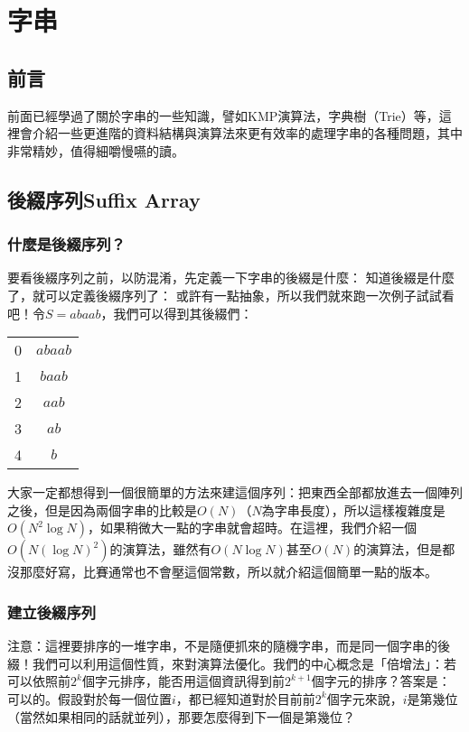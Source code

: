 \chapter{字串\uppercase\expandafter{}}
\section{前言}
		前面已經學過了關於字串的一些知識，譬如KMP演算法，字典樹（Trie）等，這裡會介紹一些更進階的資料結構與演算法來更有效率的處理字串的各種問題，其中非常精妙，值得細嚼慢嚥的讀。
	\section{後綴序列Suffix Array}
		\subsection{什麼是後綴序列？}
			要看後綴序列之前，以防混淆，先定義一下字串的後綴是什麼：
			知道後綴是什麼了，就可以定義後綴序列了：
			或許有一點抽象，所以我們就來跑一次例子試試看吧！令$S = abaab$，我們可以得到其後綴們：
			\begin{center}
				\begin{tabular}{c  c}
					0&$abaab$\\
					1&$baab$\\
					2&$aab$\\
					3&$ab$\\
					4&$b$\\
				\end{tabular}
			\end{center}
			大家一定都想得到一個很簡單的方法來建這個序列：把東西全部都放進去一個陣列之後，但是因為兩個字串的比較是$O(N)$（$N$為字串長度），所以這樣複雜度是$O(N^2 \log N)$，如果稍微大一點的字串就會超時。在這裡，我們介紹一個$O(N (\log N)^2)$的演算法，雖然有$O(N \log N)$甚至$O(N)$的演算法，但是都沒那麼好寫，比賽通常也不會壓這個常數，所以就介紹這個簡單一點的版本。
		\subsection{建立後綴序列}
			注意：這裡要排序的一堆字串，不是隨便抓來的隨機字串，而是同一個字串的後綴！我們可以利用這個性質，來對演算法優化。我們的中心概念是「倍增法」：若可以依照前$2^k$個字元排序，能否用這個資訊得到前$2^{k + 1}$個字元的排序？答案是：可以的。假設對於每一個位置$i$，都已經知道對於目前前$2^k$個字元來說，$i$是第幾位（當然如果相同的話就並列），那要怎麼得到下一個是第幾位？
			
